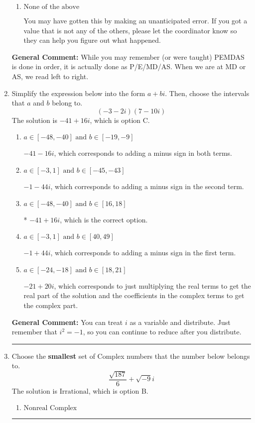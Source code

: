 \documentclass{extbook}[14pt]
\newcommand{\litem}[1]{\item #1

\rule{\textwidth}{0.4pt}}
\begin{document}
\begin{enumerate}
{\begin{enumerate}[label=\Alph*.]
 -15.105, which corresponds to an Order of Operations error: not reading left-to-right for multiplication/division.
\item \( \text{None of the above} \)

 You may have gotten this by making an unanticipated error. If you got a value that is not any of the others, please let the coordinator know so they can help you figure out what happened.
\end{enumerate}

\textbf{General Comment:} While you may remember (or were taught) PEMDAS is done in order, it is actually done as P/E/MD/AS. When we are at MD or AS, we read left to right.
}
\litem{
Simplify the expression below into the form $a+bi$. Then, choose the intervals that $a$ and $b$ belong to.
\[ (-3 - 2 i)(7 - 10 i) \]The solution is \( -41 + 16 i \), which is option C.\begin{enumerate}[label=\Alph*.]
\item \( a \in [-48, -40] \text{ and } b \in [-19, -9] \)

 $-41 - 16 i$, which corresponds to adding a minus sign in both terms.
\item \( a \in [-3, 1] \text{ and } b \in [-45, -43] \)

 $-1 - 44 i$, which corresponds to adding a minus sign in the second term.
\item \( a \in [-48, -40] \text{ and } b \in [16, 18] \)

* $-41 + 16 i$, which is the correct option.
\item \( a \in [-3, 1] \text{ and } b \in [40, 49] \)

 $-1 + 44 i$, which corresponds to adding a minus sign in the first term.
\item \( a \in [-24, -18] \text{ and } b \in [18, 21] \)

 $-21 + 20 i$, which corresponds to just multiplying the real terms to get the real part of the solution and the coefficients in the complex terms to get the complex part.
\end{enumerate}

\textbf{General Comment:} You can treat $i$ as a variable and distribute. Just remember that $i^2=-1$, so you can continue to reduce after you distribute.
}
\litem{
Choose the \textbf{smallest} set of Complex numbers that the number below belongs to.
\[ \frac{\sqrt{187}}{6}+\sqrt{-9}i \]The solution is \( \text{Irrational} \), which is option B.\begin{enumerate}[label=\Alph*.]
\item \( \text{Nonreal Complex} \)


\end{enumerate}}
\end{enumerate}
\end{document}
